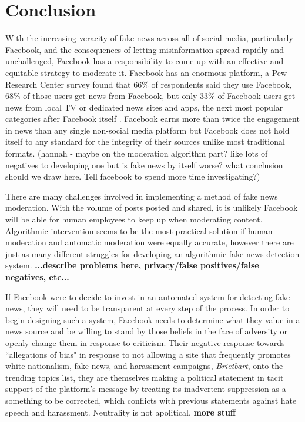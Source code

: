 \documentclass[12pt]{article}
\begin{document}
\section{Conclusion}

With the increasing veracity of fake news across all of social media, particularly Facebook, and the consequences of letting misinformation spread rapidly and unchallenged, Facebook has a responsibility to come up with an effective and equitable strategy to moderate it. Facebook has an enormous platform, a Pew Research Center survey found that 66\% of respondents said they use Facebook, 68\% of those users get news from Facebook, but only 33\% of Facebook users get news from local TV or dedicated news sites and apps, the next most popular categories after Facebook itself \citep{pew_news}. Facebook earns more than twice the engagement in news than any single non-social media platform but Facebook does not hold itself to any standard for the integrity of their sources unlike most traditional formats. (hannah - maybe on the moderation algorithm part? like lots of negatives to developing one but is fake news by itself worse? what conclusion should we draw here. Tell facebook to spend more time investigating?)

There are many challenges involved in implementing a method of fake news moderation. With the volume of posts posted and shared, it is unlikely Facebook will be able for human employees to keep up when moderating content. Algorithmic intervention seems to be the most practical solution if human moderation and automatic moderation were equally accurate, however there are just as many different struggles for developing an algorithmic fake news detection system. \textbf{...describe problems here, privacy/false positives/false negatives, etc...}

If Facebook were to decide to invest in an automated system for detecting fake news, they will need to be transparent at every step of the process. In order to begin designing such a system, Facebook needs to determine what they value in a news source and be willing to stand by those beliefs in the face of adversity or openly change them in response to criticism. Their negative response towards ``allegations of bias" in response to not allowing a site that frequently promotes white nationalism, fake news, and harassment campaigns, \textit{Brietbart}, onto the trending topics list, they are themselves making a political statement in tacit support of the platform's message by treating its inadvertent suppression as a something to be corrected, which conflicts with previous statements against hate speech and harassment. Neutrality is not apolitical. \textbf{more stuff}

\newpage
%
%
\printbibliography
\end{document}
